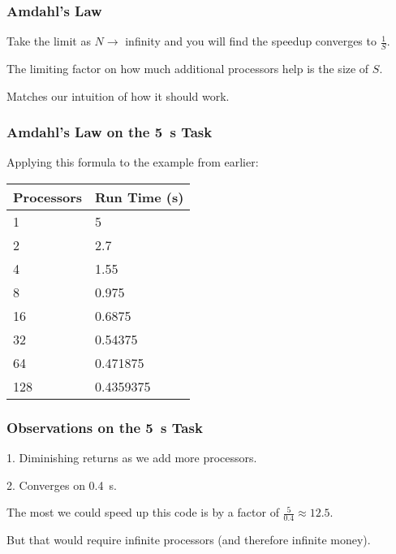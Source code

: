 \begin{frame}
	\frametitle{Amdahl's Law}

	Take the limit as $N \rightarrow$ infinity and you will find the speedup converges to $\frac{1}{S}$.


	The limiting factor on how much additional processors help is the size of $S$.

	Matches our intuition of how it should work.

\end{frame}


\begin{frame}
	\frametitle{Amdahl's Law on the 5~s Task}

	Applying this formula to the example from earlier:

	\begin{center}
		\begin{tabular}{l|l}
			\textbf{Processors} & \textbf{Run Time (s)} \\ \hline
			1                   & 5                     \\
			2                   & 2.7                   \\
			4                   & 1.55                  \\
			8                   & 0.975                 \\
			16                  & 0.6875                \\
			32                  & 0.54375               \\
			64                  & 0.471875              \\
			128                 & 0.4359375             \\
		\end{tabular}
	\end{center}

\end{frame}


\begin{frame}
	\frametitle{Observations on the 5~s Task}

	1. Diminishing returns as we add more processors.

	2. Converges on 0.4~s.

	The most we could speed up this code is by a factor of $\frac{5}{0.4}\approx 12.5$.

	But that would require infinite processors (and therefore infinite money).

\end{frame}


